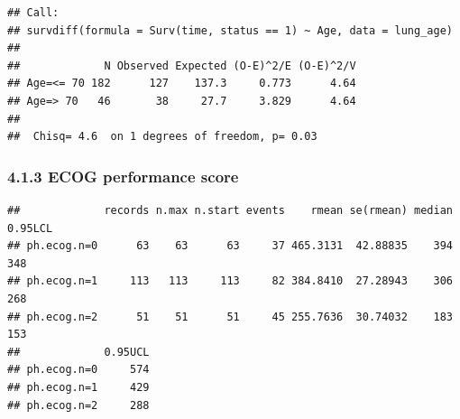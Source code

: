 \documentclass[
]{article}
\newenvironment{Shaded}{\begin{snugshade}}{\end{snugshade}}
\newcommand{\AttributeTok}[1]{\textcolor[rgb]{0.77,0.63,0.00}{#1}}
\newcommand{\CommentTok}[1]{\textcolor[rgb]{0.56,0.35,0.01}{\textit{#1}}}
\newcommand{\DecValTok}[1]{\textcolor[rgb]{0.00,0.00,0.81}{#1}}
\newcommand{\FunctionTok}[1]{\textcolor[rgb]{0.00,0.00,0.00}{#1}}
\newcommand{\NormalTok}[1]{#1}
\newcommand{\OtherTok}[1]{\textcolor[rgb]{0.56,0.35,0.01}{#1}}
\newcommand{\SpecialCharTok}[1]{\textcolor[rgb]{0.00,0.00,0.00}{#1}}
\begin{document}
\begin{verbatim}
## Call:
## survdiff(formula = Surv(time, status == 1) ~ Age, data = lung_age)
## 
##             N Observed Expected (O-E)^2/E (O-E)^2/V
## Age=<= 70 182      127    137.3     0.773      4.64
## Age=> 70   46       38     27.7     3.829      4.64
## 
##  Chisq= 4.6  on 1 degrees of freedom, p= 0.03
\end{verbatim}

\hypertarget{ecog-performance-score}{%
\subsubsection{4.1.3 ECOG performance
score}\label{ecog-performance-score}}

\begin{Shaded}
\end{Shaded}

\begin{verbatim}
##             records n.max n.start events    rmean se(rmean) median 0.95LCL
## ph.ecog.n=0      63    63      63     37 465.3131  42.88835    394     348
## ph.ecog.n=1     113   113     113     82 384.8410  27.28943    306     268
## ph.ecog.n=2      51    51      51     45 255.7636  30.74032    183     153
##             0.95UCL
## ph.ecog.n=0     574
## ph.ecog.n=1     429
## ph.ecog.n=2     288
\end{verbatim}
\end{document}
